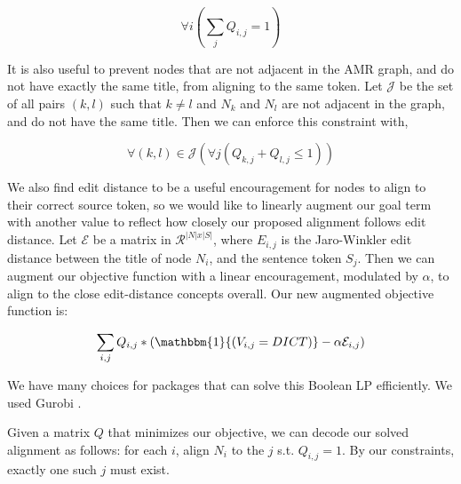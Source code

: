\[\forall i (\sum_{j} Q_{i,j} = 1)\]

It is also useful to prevent nodes that are not adjacent in the AMR graph, and do not have exactly the same title, from aligning to the same token. Let $\mathcal{J}$ be the set of all pairs $(k,l)$ such that $k \neq l$ and $N_k$ and $N_l$ are not adjacent in the graph, and do not have the same title. Then we can enforce this constraint with,

\[\forall (k,l) \in \mathcal{J} (\forall j (Q_{k,j} + Q_{l,j} \leq 1))\]

We also find edit distance to be a useful encouragement for nodes to align to their correct source token, so we would like to linearly augment our goal term with another value to reflect how closely our proposed alignment follows edit distance. Let $\mathcal{E}$ be a matrix in $\mathcal{R}^{|N|x|S|}$, where $E_{i,j}$ is the Jaro-Winkler edit distance between the title of node $N_i$, and the sentence token $S_j$. Then we can augment our objective function with a linear encouragement, modulated by $\alpha$, to align to the close edit-distance concepts overall. Our new augmented objective function is:

\[\sum_{i,j} Q_{i,j}*(\mathbbm{1}{(V_{i,j} = DICT)} - \alpha \mathcal{E}_{i,j})\]

We have many choices for packages that can solve this Boolean LP efficiently. We used Gurobi \needcite.

Given a matrix $Q$ that minimizes our objective, we can decode our solved alignment as follows: for each $i$, align $N_i$ to the $j$ s.t. $Q_{i,j} = 1$. By our constraints, exactly one such $j$ must exist.